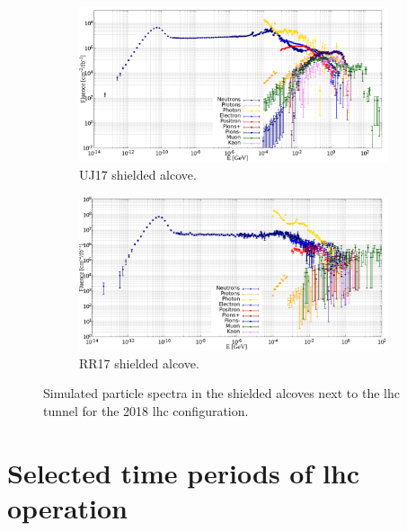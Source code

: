 \documentclass[encoding=utf8,british]{tumphthesis}
\begin{document}
\begin{figure}[H]
    \centering 

\begin{subfigure}{0.65\textwidth}
    \centering
    \includegraphics[width=\linewidth]{results/particle_spectra_location_UJ17.png}
  \caption{UJ17 shielded alcove.}
  \label{fig:LHC-particle-distributions-UJ17}
\end{subfigure}

\medskip

\begin{subfigure}{0.65\textwidth}
  \includegraphics[width=\linewidth]{results/particle_spectra_location_RR17_large.png}
  \caption{RR17 shielded alcove.}
  \label{fig:LHC-particle-distributions-RR17}
\end{subfigure}
\caption{Simulated particle spectra in the shielded alcoves next to the \acrshort{lhc} tunnel for the 2018 \acrshort{lhc} configuration.}
\label{fig:LHC-particle-distributions-shielded-alcoves}

\end{figure}

\section{Selected time periods of \acrshort{lhc} operation}
\label{section:constant-beam-parameters}
\end{document}
